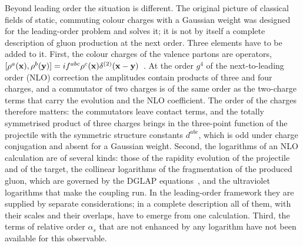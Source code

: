 Beyond leading order the situation is different. The original picture of classical fields of static, commuting colour charges with a Gaussian weight was designed for the leading-order problem and solves it; it is not by itself a complete description of gluon production at the next order. Three elements have to be added to it. First, the colour charges of the valence partons are operators, $[\rho^a(\mathbf{x}),\rho^b(\mathbf{y})]=if^{abc}\rho^c(\mathbf{x})\delta^{(2)}(\mathbf{x}-\mathbf{y})$~\cite{Kovner:2005pe,Kovner:2005nq,Kovner:2005jc,Kovner:2005en}. At the order $g^4$ of the next-to-leading order (NLO) correction the amplitudes contain products of three and four charges, and a commutator of two charges is of the same order as the two-charge terms that carry the evolution and the NLO coefficient. The order of the charges therefore matters: the commutators leave contact terms, and the totally symmetrised product of three charges brings in the three-point function of the projectile with the symmetric structure constants $d^{abc}$, which is odd under charge conjugation and absent for a Gaussian weight. Second, the logarithms of an NLO calculation are of several kinds: those of the rapidity evolution of the projectile and of the target, the collinear logarithms of the fragmentation of the produced gluon, which are governed by the DGLAP equations~\cite{Gribov:1972ri,Altarelli:1977zs,Dokshitzer:1977sg}, and the ultraviolet logarithms that make the coupling run. In the leading-order framework they are supplied by separate considerations; in a complete description all of them, with their scales and their overlaps, have to emerge from one calculation. Third, the terms of relative order $\alpha_s$ that are not enhanced by any logarithm have not been available for this observable.

